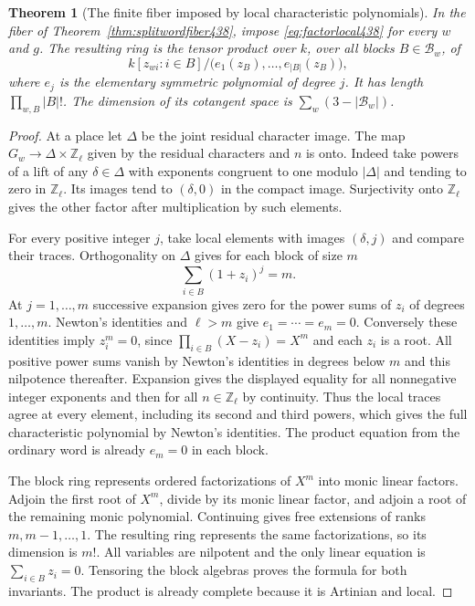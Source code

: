 \documentclass[a4paper,11pt]{article}
\newtheorem{theorem}[proposition]{Theorem}
\theoremstyle{definition}
\theoremstyle{remark}
\newcommand{\ZZ}{\mathbb Z}\newcommand{\ord}{\operatorname{ord}}
\numberwithin{equation}{section}
\begin{document}
\begin{theorem}[The finite fiber imposed by local characteristic polynomials]\leavevmode
\label{thm:flagfiber438}
In the fiber of Theorem~\ref{thm:splitwordfiber438}, impose
\eqref{eq:factorlocal438} for every \(w\) and \(g\).
The resulting ring is the tensor product over \(k\), over
all blocks \(B\in\mathcal B_w\), of
\[
 k[z_{wi}:i\in B]/
 \bigl(e_1(z_B),\ldots,e_{|B|}(z_B)\bigr),
\]
where \(e_j\) is the elementary symmetric polynomial of
degree \(j\). It has length \(\prod_{w,B}|B|!\). The
dimension of its cotangent space is
\(\sum_w(3-|\mathcal B_w|)\).
\end{theorem}
\begin{proof}
At a place let \(\Delta\) be the joint residual character
image. The map \(G_w\to\Delta\times\ZZ_\ell\) given by the
residual characters and \(n\) is onto. Indeed take powers
of a lift of any \(\delta\in\Delta\) with exponents congruent
to one modulo \(|\Delta|\) and tending to zero in
\(\ZZ_\ell\). Its images tend to \((\delta,0)\) in the
compact image. Surjectivity onto \(\ZZ_\ell\) gives the
other factor after multiplication by such elements.

For every positive integer \(j\), take local elements with
images \((\delta,j)\) and compare their traces. Orthogonality
on \(\Delta\) gives for each block of size \(m\)
\[
       \sum_{i\in B}(1+z_i)^j=m .
\]
At \(j=1,\ldots,m\) successive expansion gives zero for the
power sums of \(z_i\) of degrees \(1,\ldots,m\).
Newton's identities and \(\ell>m\) give \(e_1=\cdots=e_m=0\).
Conversely these identities imply \(z_i^m=0\), since
\(\prod_{i\in B}(X-z_i)=X^m\) and each \(z_i\) is a root.
All positive power sums vanish by Newton's identities in
degrees below \(m\) and this nilpotence thereafter. Expansion
gives the displayed equality for all nonnegative integer
exponents and then for all \(n\in\ZZ_\ell\) by continuity.
Thus the local traces agree at every element, including its
second and third powers, which gives the full characteristic
polynomial by Newton's identities. The product equation
from the ordinary word is already \(e_m=0\) in each block.

The block ring represents ordered factorizations of \(X^m\)
into monic linear factors. Adjoin the first root of \(X^m\),
divide by its monic linear factor, and adjoin a root of the
remaining monic polynomial. Continuing gives free extensions
of ranks \(m,m-1,\ldots,1\). The resulting ring represents
the same factorizations, so its dimension is \(m!\).
All variables are nilpotent and the only linear equation
is \(\sum_{i\in B}z_i=0\). Tensoring the block algebras proves
the formula for both invariants. The product is already
complete because it is Artinian and local.
\end{proof}
\end{document}
